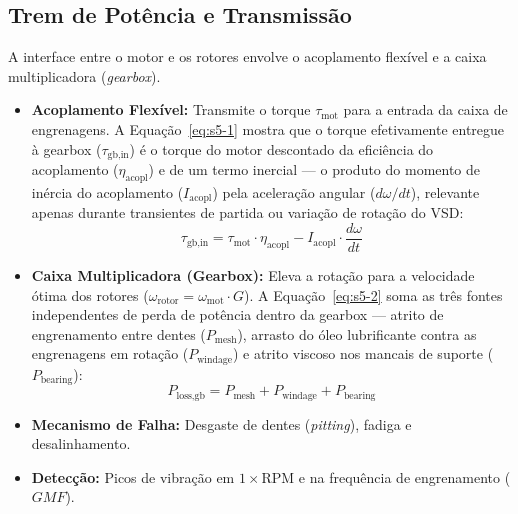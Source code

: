 \documentclass[12pt,a4paper]{article}
\numberwithin{equation}{section}
\numberwithin{table}{section}
\numberwithin{figure}{section}
\begin{document}
{	\subsection{\textbf{Trem de Potência e Transmissão}}
	A interface entre o motor e os rotores envolve o acoplamento flexível e a caixa multiplicadora (\textit{gearbox}).
	\begin{itemize}
		\item \textbf{Acoplamento Flexível:} Transmite o torque $\tau_{\text{mot}}$ para a entrada da caixa de engrenagens. A Equação~\eqref{eq:s5-1} mostra que o torque efetivamente entregue à gearbox ($\tau_{\text{gb,in}}$) é o torque do motor descontado da eficiência do acoplamento ($\eta_{\text{acopl}}$) e de um termo inercial — o produto do momento de inércia do acoplamento ($I_{\text{acopl}}$) pela aceleração angular ($d\omega/dt$), relevante apenas durante transientes de partida ou variação de rotação do VSD:
		\begin{equation}\label{eq:s5-1}
 \tau_{\text{gb,in}} = \tau_{\text{mot}} \cdot \eta_{\text{acopl}} - I_{\text{acopl}} \cdot \frac{d\omega}{dt}
\end{equation}
		\item \textbf{Caixa Multiplicadora (Gearbox):} Eleva a rotação para a velocidade ótima dos rotores ($\omega_{\text{rotor}} = \omega_{\text{mot}} \cdot G$). A Equação~\eqref{eq:s5-2} soma as três fontes independentes de perda de potência dentro da gearbox — atrito de engrenamento entre dentes ($P_{\text{mesh}}$), arrasto do óleo lubrificante contra as engrenagens em rotação ($P_{\text{windage}}$) e atrito viscoso nos mancais de suporte ($P_{\text{bearing}}$):
		\begin{equation}\label{eq:s5-2}
 P_{\text{loss,gb}} = P_{\text{mesh}} + P_{\text{windage}} + P_{\text{bearing}}
\end{equation}
		\item \textbf{Mecanismo de Falha:} Desgaste de dentes (\textit{pitting}), fadiga e desalinhamento.
		\item \textbf{Detecção:} Picos de vibração em $1 \times \text{RPM}$ e na frequência de engrenamento ($GMF$).
	\end{itemize}
	
}
\end{document}
